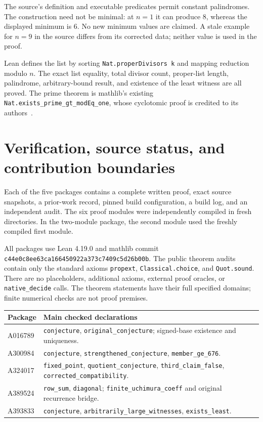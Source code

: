 \documentclass[11pt]{article}
\begin{document}
The source's definition and executable predicates permit constant
palindromes. The construction need not be minimal: at $n=1$ it can
produce $8$, whereas the displayed minimum is $6$. No new minimum values
are claimed. A stale example for $n=9$ in the source differs from its
corrected data; neither value is used in the proof.

Lean defines the list by sorting \texttt{Nat.properDivisors k} and
mapping reduction modulo $n$. The exact list equality, total divisor
count, proper-list length, palindrome, arbitrary-bound result, and
existence of the least witness are all proved. The prime theorem is
mathlib's existing \texttt{Nat.exists\_prime\_gt\_modEq\_one}, whose
cyclotomic proof is credited to its authors~\cite{PrimesOne}.

\section{Verification, source status, and contribution boundaries}

Each of the five packages contains a complete written proof, exact source
snapshots, a prior-work record, pinned build configuration, a build log,
and an independent audit. The six proof modules were independently
compiled in fresh directories. In the two-module package, the second
module used the freshly compiled first module.

All packages use Lean 4.19.0 and mathlib commit
\texttt{c44e0c8ee63ca166450922a373c7409c5d26b00b}.
The public theorem audits contain only the standard axioms
\texttt{propext}, \texttt{Classical.choice}, and \texttt{Quot.sound}.
There are no placeholders, additional axioms, external proof oracles,
or \texttt{native\_decide} calls. The theorem statements have their full
specified domains; finite numerical checks are not proof premises.

\begin{center}
\begin{tabular}{@{}l>{\raggedright\arraybackslash}p{4.7in}@{}}
\toprule
Package & Main checked declarations\\
\midrule
A016789 & \texttt{conjecture}, \texttt{original\_conjecture}; signed-base existence and uniqueness.\\
A300984 & \texttt{conjecture}, \texttt{strengthened\_conjecture}, \texttt{member\_ge\_676}.\\
A324017 & \texttt{fixed\_point}, \texttt{quotient\_conjecture}, \texttt{third\_claim\_false}, \texttt{corrected\_compatibility}.\\
A389524 & \texttt{row\_sum}, \texttt{diagonal}; \texttt{finite\_uchimura\_coeff} and original recurrence bridge.\\
A393833 & \texttt{conjecture}, \texttt{arbitrarily\_large\_witnesses}, \texttt{exists\_least}.\\
\bottomrule
\end{tabular}
\end{center}
\end{document}
